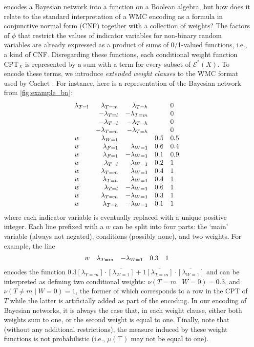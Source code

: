 \documentclass[letterpaper]{article} %
\theoremstyle{definition}
\theoremstyle{remark}
\begin{document}
{ encodes a Bayesian network into a function on a Boolean
algebra, but how does it relate to the standard interpretation of a WMC encoding
as a formula in conjunctive normal form (CNF) together with a collection of
weights? The factors of $\phi$ that restrict the values of indicator variables
for non-binary random variables are already expressed as a product of sums of
0/1-valued functions, i.e., a kind of CNF. Disregarding these functions, each
conditional weight function $\mathrm{CPT}_X$ is represented by a sum with a term
for every subset of $\mathcal{E}^*(X)$. To encode these terms, we introduce
\emph{extended weight clauses} to the WMC format used by Cachet
\cite{DBLP:conf/sat/SangBBKP04}. For instance, here is a representation of the
Bayesian network from \cref{fig:example_bn}:
\[
  \begin{array}{lrrll}
    \lambda\sb{T=l} &\lambda\sb{T=m} &\lambda\sb{T=h} & &0 \\
                    &-\lambda\sb{T=l} &-\lambda\sb{T=m} & &0 \\
                    &-\lambda\sb{T=l} &-\lambda\sb{T=h} & &0 \\
                    &-\lambda\sb{T=m} &-\lambda\sb{T=h} & &0 \\
    w &\lambda\sb{W=1} & &0.5 &0.5 \\
    w &\lambda\sb{F=1} &\lambda\sb{W=1} &0.6 &0.4 \\
    w &\lambda\sb{F=1} &-\lambda\sb{W=1} &0.1 &0.9 \\
    w &\lambda\sb{T=l} &\lambda\sb{W=1} &0.2 &1 \\
    w &\lambda\sb{T=m} &\lambda\sb{W=1} &0.4 &1 \\
    w &\lambda\sb{T=h} &\lambda\sb{W=1} &0.4 &1 \\
    w &\lambda\sb{T=l} &-\lambda\sb{W=1} &0.6 &1 \\
    w &\lambda\sb{T=m} &-\lambda\sb{W=1} &0.3 &1 \\
    w &\lambda\sb{T=h} &-\lambda\sb{W=1} &0.1 &1
  \end{array}
\]
where each indicator variable is eventually replaced with a unique positive
integer. Each line prefixed with a $w$ can be split into four parts: the `main'
variable (always not negated), conditions (possibly none), and two weights. For
example, the line
\[
  \begin{array}{lrrll}
    w &\lambda\sb{T=m} &-\lambda\sb{W=1} &0.3 &1
  \end{array}
\]
encodes the function $0.3[\lambda_{T=m}] \cdot \overline{[\lambda_{W=1}]} +
1\overline{[\lambda_{T=m}]} \cdot \overline{[\lambda_{W=1}]}$ and can be
interpreted as defining two conditional weights: $\nu(T = m \mid W = 0) = 0.3$,
and $\nu(T \ne m \mid W = 0) = 1$, the former of which corresponds to a row in
the CPT of $T$ while the latter is artificially added as part of the encoding.
In our encoding of Bayesian networks, it is always the case that, in each weight
clause, either both weights sum to one, or the second weight is equal to one.
Finally, note that (without any additional restrictions), the measure induced by
these weight functions is not probabilistic (i.e., $\mu(\top)$ may not be equal
to one).

}
\end{document}
